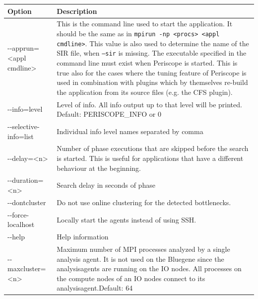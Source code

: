 \documentclass[11pt,oneside,a4paper]{book}
\begin{document}
\begin{center}
 \label{table:frontend-options}
 \begin{longtable}{|p{5cm}|p{7cm}|}
  \hline
  Option & Description \\
  \hline
  -{}-apprun=\textless appl cmdline\textgreater &
  This is the command line used to start the application. It should be the same as in \texttt{mpirun -np <procs> <appl cmdline>}.\newline\newline
  This value is also used to determine the name of the SIR file, when \texttt{--sir} is missing.\newline\newline
   The executable specified in the command line must exist when Periscope is started. This is true also for the cases where the tuning feature of Periscope is used in combination with plugins which by themselves re-build the application from its source files (e.g. the CFS plugin).\\
  \hline

  -{}-info=level &
  Level of info. All info output up to that level will be printed.\newline
Default: PERISCOPE\_INFO or 0 \\
  \hline

  -{}-selective-info=list &
  Individual info level names separated by comma\\
  \hline

  -{}-delay=\textless n\textgreater &
  Number of phase executions that are skipped before the search is started. This is useful for applications that have a different behaviour at the beginning. \\
  \hline

   -{}-duration=\textless n\textgreater &
 Search delay in seconds of phase\\
  \hline

  -{}-dontcluster &
  Do not use online clustering for the detected bottlenecks.\\
  \hline

  -{}-force-localhost &
  Locally start the agents instead of using SSH. \\
  \hline

  -{}-help &
  Help information \\
  \hline

  -{}-maxcluster=\textless n\textgreater &
  Maximum number of MPI processes analyzed by a single analysis agent.\newline\newline
  It is not used on the Bluegene since the analysisagents are running on the IO nodes. All processes on the compute nodes of an IO nodes connect to its analysisagent.\newline\newline Default: 64 \\
  \hline


\end{longtable}
\end{center}
\end{document}
